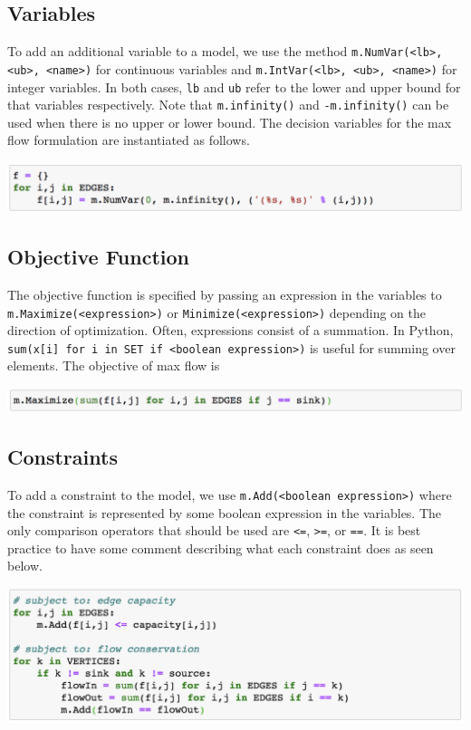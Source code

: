 \documentclass[11 pt]{article}
\newcommand{\code}[1]{\colorbox{gray!10}{\textcolor{black!85}{\texttt{#1}}}}
\begin{document}
\subsection{Variables}

To add an additional variable to a model, we use the method \code{m.NumVar(<lb>, <ub>, <name>)} for continuous variables and \code{m.IntVar(<lb>, <ub>, <name>)} for integer variables. In both cases, \texttt{lb} and \texttt{ub} refer to the lower and upper bound for that variables respectively. Note that \texttt{m.infinity()} and \texttt{-m.infinity()} can be used when there is no upper or lower bound. The decision variables for the max flow formulation are instantiated as follows.
\begin{center}
\includegraphics[scale=0.7]{images/var.png}
\end{center}

\subsection{Objective Function}

The objective function is specified by passing an expression in the variables to \code{m.Maximize(<expression>)} or \code{Minimize(<expression>)} depending on the direction of optimization. Often, expressions consist of a summation. In Python, \code{sum(x[i] for i in SET if <boolean expression>)} is useful for summing over elements. The objective of max flow is
\begin{center}
\includegraphics[scale=0.7]{images/obj.png}
\end{center}

\subsection{Constraints}

To add a constraint to the model, we use \code{m.Add(<boolean expression>)} where the constraint is represented by some boolean expression in the variables. The only comparison operators that should be used are \texttt{<=}, \texttt{>=}, or \texttt{==}. It is best practice to have some comment describing what each constraint does as seen below.
\begin{center}
\includegraphics[scale=0.7]{images/constraints.png}
\end{center}
\end{document}
